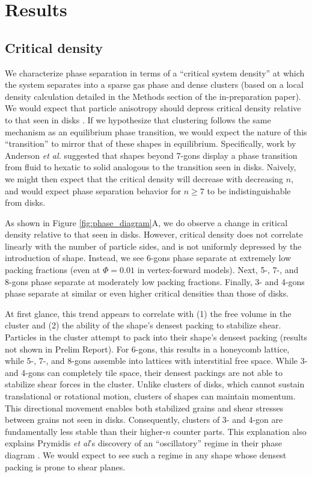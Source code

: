 \section*{Results}


\subsection*{Critical density}

We characterize phase separation in terms of a ``critical system density'' at which the system separates into a sparse gas phase and dense clusters (based on a local density calculation detailed in the Methods section of the in-preparation paper).
We would expect that particle anisotropy should depress critical density relative to that seen in disks \cite{PrymidisEA_2016_SoftMatter}.
If we hypothesize that clustering follows the same mechanism as an equilibrium phase transition, we would expect the nature of this ``transition'' to mirror that of these shapes in equilibrium.
Specifically, work by Anderson \textit{et al.} suggested that shapes beyond 7-gons display a phase transition from fluid to hexatic to solid analogous to the transition seen in disks.
Naively, we might then expect that the critical density will decrease with decreasing $n$, and would expect phase separation behavior for $n{\geq}7$ to be indistinguishable from disks.

As shown in Figure \ref{fig:phase_diagram}A, we do observe a change in critical density relative to that seen in disks.
However, critical density does not correlate linearly with the number of particle sides, and is not uniformly depressed by the introduction of shape.
Instead, we see 6-gons phase separate at extremely low packing fractions (even at $\Phi=0.01$ in vertex-forward models). 
Next, 5-, 7-, and 8-gons phase separate at moderately low packing fractions.
Finally, 3- and 4-gons phase separate at similar or even higher critical densities than those of disks.

At first glance, this trend appears to correlate with (1) the free volume in the cluster and (2) the ability of the shape's densest packing to stabilize shear.
Particles in the cluster attempt to pack into their shape's densest packing \cite{AtkinsonEA_2012_PRE} (results not shown in Prelim Report).
For 6-gons, this results in a honeycomb lattice, while 5-, 7-, and 8-gons assemble into lattices with interstitial free space.
While 3- and 4-gons can completely tile space, their densest packings are not able to stabilize shear forces in the cluster. 
Unlike clusters of disks, which cannot sustain translational or rotational motion, clusters of shapes can maintain momentum.
This directional movement enables both stabilized grains and shear stresses between grains not seen in disks.
Consequently, clusters of 3- and 4-gon are fundamentally less stable than their higher-$n$ counter parts. 
This explanation also explains Prymidis \textit{et al}'s discovery of an ``oscillatory'' regime in their phase diagram \cite{PrymidisEA_2016_SoftMatter}.
We would expect to see such a regime in any shape whose densest packing is prone to shear planes.


